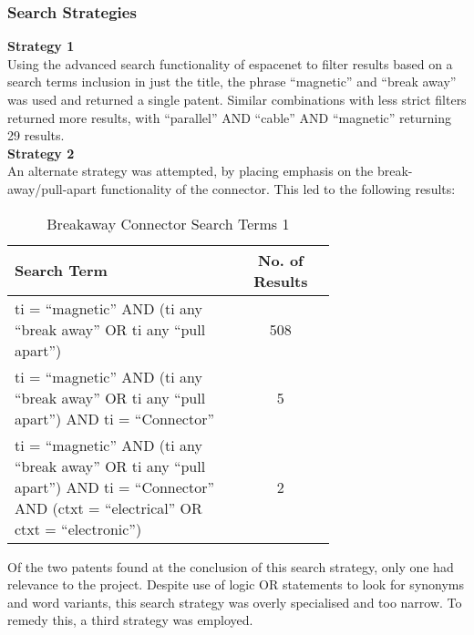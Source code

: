 \documentclass [12pt]{article}
\begin{document}
\subsubsection{Search Strategies}
\textbf{Strategy 1}\\
Using the advanced search functionality of espacenet to filter results based on a search terms inclusion in just the title, the phrase “magnetic” and “break away” was used and returned a single patent. 
Similar combinations with less strict filters returned more results, with “parallel” AND “cable” AND “magnetic” returning 29 results. \\
\textbf{Strategy 2}\\
An alternate strategy was attempted, by placing emphasis on the break-away/pull-apart functionality of the connector. This led to the following results:
\begin{table}[H]
    \centering
    \setlength{\arrayrulewidth}{1.5pt}
    \begin{tabular}{|p{0.7\linewidth}|c|}
    \hline
    \cellcolor{gray!40}Search Term & \cellcolor{gray!40}No. of Results \\
    \hline
    ti = “magnetic” AND (ti any “break away” OR ti any “pull apart”) & 508 \\
    \hline
    ti = “magnetic” AND (ti any “break away” OR ti any “pull apart”) AND ti = “Connector” & 5 \\
    \hline
    ti = “magnetic” AND (ti any “break away” OR ti any “pull apart”) AND ti = “Connector” AND (ctxt = “electrical” OR ctxt = “electronic”) & 2 \\
    \hline
    \end{tabular}
    \caption{Breakaway Connector Search Terms 1}
    \label{table:breakaway_connector_search_strat_2}
\end{table}
Of the two patents found at the conclusion of this search strategy, only one had relevance to the project. Despite use of logic OR statements to look for synonyms and word variants, this search strategy was overly specialised and too narrow. To remedy this, a third strategy was employed.\\
\end{document}
